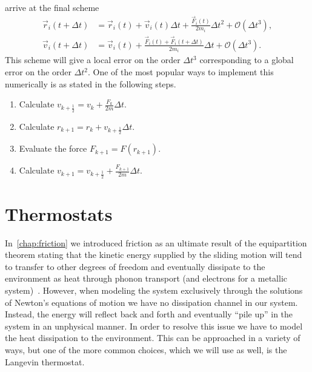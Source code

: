 arrive at the final scheme
\begin{align*}
  \vec{r}_i(t + \Delta t) &= \vec{r}_i(t) + \vec{v}_i(t) \Delta t + \frac{\vec{F}_i(t)}{2m_i}\Delta t^2 + \mathcal{O}(\Delta t^3), \\
  \vec{v}_i(t+\Delta t)  &= \vec{v}_i(t) + \frac{\vec{F}_i(t) + \vec{F}_i(t+\Delta t)}{2m_i}  \Delta t + \mathcal{O}(\Delta t^3).
\end{align*}
This scheme will give a local error on the order $\Delta t^3$ corresponding to a
global error on the order $\Delta t^2$. One of the most popular ways to implement this
numerically is as stated in the following steps.
\begin{enumerate}[leftmargin=6cm]
  \item Calculate $v_{k+\frac{1}{2}} = v_k + \frac{F_k}{2m} \Delta t$.
  \item Calculate $r_{k+1} = r_k + v_{k+\frac{1}{2}} \Delta t$.
  \item Evaluate the force $F_{k+1} = F(r_{k+1})$.
  \item Calculate $v_{k+1} = v_{k+\frac{1}{2}} + \frac{F_{k+1}}{2m} \Delta t$.
\end{enumerate}


\section{Thermostats}\label{sec:thermostat}
In~\cref{chap:friction} we introduced friction as an ultimate result of the equipartition theorem stating that the kinetic energy supplied by the sliding motion will tend to transfer to other degrees of freedom and eventually dissipate to the environment as heat through phonon transport (and electrons for a metallic system)~\cite{Manini_2016}. However, when modeling the system exclusively through the solutions of Newton's equations of motion we have no dissipation channel in our system. Instead, the energy will reflect back and forth and eventually ``pile up'' in the system in an unphysical manner. In order to resolve this issue we have to model the heat dissipation to the environment. This can be approached in a variety of ways, but one of the more common choices, which we will use as well, is the Langevin thermostat.




